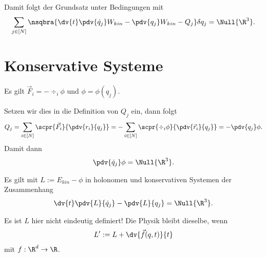 \documentclass[../main.tex]{subfiles}
\begin{document}
			\begin{info}
				Damit folgt der Grundsatz unter  Bedingungen mit
				\begin{align*}
					\sum_{j\in[N]}\nsqbra{\dv{t}\pdv	{\dot q_j}W_{kin}-\pdv{q_j}W_{kin}-Q_j}\delta q_j=\Null{\R^3}. 
				\end{align*}
			\end{info}
			
		\section{Konservative Systeme}
			\begin{Voraussetzung}
				Es gilt $\vec{F}_i=-\div_i\phi$ und $\phi=\phi(q_j)$.
			\end{Voraussetzung}
			Setzen wir dies in die Definition von $Q_j$ ein, dann folgt
			\begin{align*}
				Q_j=\sum_{i\in[N]}\scpr{\vec{F}_i}{\pdv{r_i}{q_j}}=-\sum_{i\in[N]}\scpr{\div_i\phi}{\pdv{\vec{r}_i}{q_j}}=-\pdv{q_j}\phi.
			\end{align*}
			Damit dann 
			\begin{align*}
				\pdv{\dot q_j}\phi=\Null{\R^3}. 
			\end{align*}
			\begin{info}
				Es gilt mit $L:=E_{kin}-\phi$ in holonomen und konservativen Systemen der Zusammenhang  
				\begin{align*}
					\dv{t}\pdv{L}{\dot q_j}-\pdv{L}{q_j}=\Null{\R^3}.
				\end{align*}
			\end{info}
			\noindent Es ist $L$ hier nicht eindeutig definiert! Die Physik bleibt dieselbe, wenn 
			\begin{align*}
				L':=L+\dv{\vec{f}(q,t)}{t}
			\end{align*}
			mit $f:\R^d\to\R$. 
			
\end{document}
